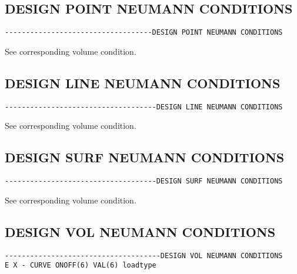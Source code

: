 
\subsection{DESIGN POINT NEUMANN CONDITIONS}
\begin{verbatim}
-----------------------------------DESIGN POINT NEUMANN CONDITIONS
\end{verbatim}

See corresponding volume condition.


\subsection{DESIGN LINE NEUMANN CONDITIONS}
\begin{verbatim}
------------------------------------DESIGN LINE NEUMANN CONDITIONS
\end{verbatim}

See corresponding volume condition.



\subsection{DESIGN SURF NEUMANN CONDITIONS}
\begin{verbatim}
------------------------------------DESIGN SURF NEUMANN CONDITIONS
\end{verbatim}

See corresponding volume condition.


\subsection{DESIGN VOL NEUMANN CONDITIONS}
\begin{verbatim}
-------------------------------------DESIGN VOL NEUMANN CONDITIONS
E X - CURVE ONOFF(6) VAL(6) loadtype
\end{verbatim}


